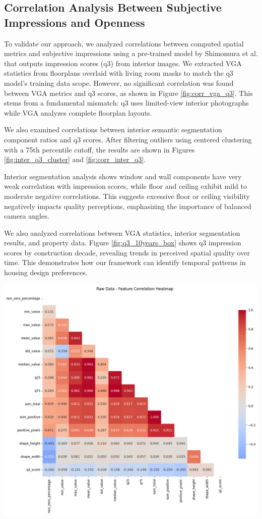 \documentclass[11pt,a4paper]{article}
\begin{document}
\begin{multicols}{2}
\section{Correlation Analysis Between Subjective Impressions and Openness}

To validate our approach, we analyzed correlations between computed spatial metrics and subjective impressions 
using a pre-trained model by Shimomura et al. that outputs impression scores (q3) from interior images.
We extracted VGA statistics from floorplans overlaid with living room masks to match the q3 model's training data scope.
However, no significant correlation was found between VGA metrics and q3 scores, as shown in Figure \ref{fig:corr_vga_q3}.
This stems from a fundamental mismatch: q3 uses limited-view interior photographs while VGA analyzes complete floorplan layouts.

We also examined correlations between interior semantic segmentation component ratios and q3 scores. 
After filtering outliers using centered clustering with a 75th percentile cutoff, the results are shown 
in Figures \ref{fig:inter_q3_cluster} and \ref{fig:corr_inter_q3}.

Interior segmentation analysis shows window and wall components have very weak correlation with impression scores, 
while floor and ceiling exhibit mild to moderate negative correlations. This suggests excessive floor or ceiling 
visibility negatively impacts quality perceptions, emphasizing the importance of balanced camera angles.

We also analyzed correlations between VGA statistics, interior segmentation results, and property data.
Figure \ref{fig:q3_10years_box} shows q3 impression scores by construction decade, revealing trends in 
perceived spatial quality over time. This demonstrates how our framework can identify temporal patterns 
in housing design preferences.
\begin{flushleft}
    \includegraphics[width=0.9\columnwidth]{plots/corr_vga_q3.png}
    \label{fig:corr_vga_q3}
\end{flushleft}


\end{multicols}
\end{document}
